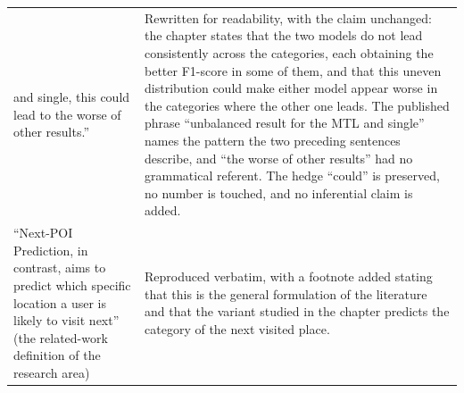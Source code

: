{\begin{longtable}{@{}p{}p{}@{}}
and single, this could lead to the worse of other results.'' &
Rewritten for readability, with the claim unchanged: the chapter states that the two
models do not lead consistently across the categories, each obtaining the better
F1-score in some of them, and that this uneven distribution could make either model
appear worse in the categories where the other one leads. The published phrase
``unbalanced result for the MTL and single'' names the pattern the two preceding
sentences describe, and ``the worse of other results'' had no grammatical referent. The
hedge ``could'' is preserved, no number is touched, and no inferential claim is added. \\
\addlinespace
``Next-POI Prediction, in contrast, aims to predict which specific location a user is
likely to visit next'' (the related-work definition of the research area) &
Reproduced verbatim, with a footnote added stating that this is the general formulation
of the literature and that the variant studied in the chapter predicts the category of
the next visited place. \\
\end{longtable}
}
